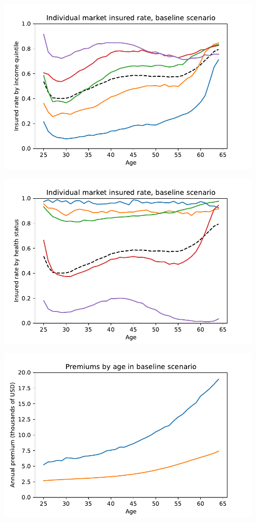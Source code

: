 \documentclass[12pt,pdftex,letterpaper]{article}
\begin{document}
\includegraphics{InsuredRateIncomeBaseline.pdf}

\includegraphics{InsuredRateHealthBaseline.pdf}

\includegraphics{PremiumsBaseline.pdf}
\end{document}
